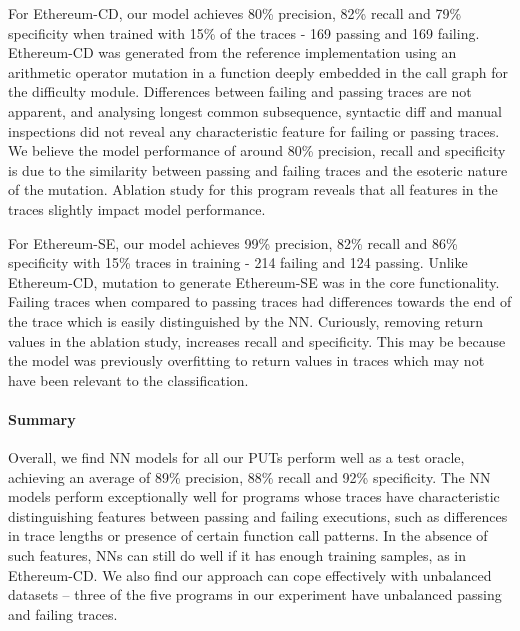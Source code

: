 For Ethereum-CD, our model achieves 80\% precision, 82\% recall and 79\% specificity when trained with 15\% of the traces - 169 passing and 169 failing. Ethereum-CD was generated from the reference implementation using an arithmetic operator mutation in a function deeply embedded in the call graph for the difficulty module. Differences between failing and passing traces are not apparent, and analysing longest common subsequence, syntactic diff and manual inspections did not reveal any characteristic feature for failing or passing traces. We believe the model performance of around 80\% precision, recall and specificity is due to the similarity between passing and failing traces and the esoteric nature of the mutation. Ablation study for this program reveals that all features in the traces slightly impact model performance. 

For Ethereum-SE, our model achieves 99\% precision, 82\% recall and 86\% specificity with 15\% traces in training - 214 failing and 124 passing. 
Unlike Ethereum-CD, mutation to generate Ethereum-SE was in the core functionality. Failing traces when compared to passing traces had differences towards the end of the trace which is easily distinguished by the NN. Curiously, removing return values in the ablation study, increases recall and specificity. This may be because the model was previously overfitting to return values in traces which may not have been relevant to the classification. %

\paragraph{Summary}
Overall, we find NN models for all our PUTs perform well as a test oracle, achieving an average of 89\% precision, 88\% recall and 92\% specificity. The NN models perform exceptionally well for programs whose traces have characteristic distinguishing features between passing and failing executions, such as differences in trace lengths or presence of certain function call patterns. In the absence of such features, NNs can still do well if it has enough training samples, as in Ethereum-CD. We also find our approach can cope effectively with unbalanced datasets -- three of the five programs in our experiment have unbalanced passing and failing traces. 

